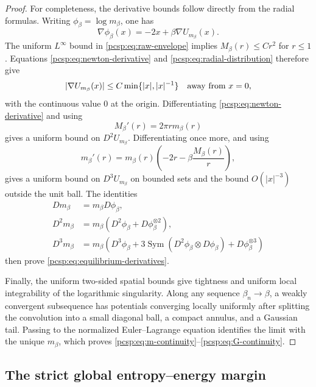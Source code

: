 \documentclass[11pt,reqno]{amsart}
\numberwithin{equation}{section}
\theoremstyle{plain}
\theoremstyle{definition}
\DeclarePairedDelimiter{\abs}{\lvert}{\rvert}
\newcommand{\be}{\beta}
\begin{document}
\begin{proof}
For completeness, the derivative bounds follow directly from the radial formulas.  Writing $\phi_\be=\log m_\be$, one has
\begin{equation}\label{pcsp:eq:score}
 \nabla\phi_\be(x)=-2x+\be\nabla U_{m_\be}(x).
\end{equation}
The uniform $L^\infty$ bound in \eqref{pcsp:eq:raw-envelope} implies $M_\be(r)\leq Cr^2$ for $r\leq1$.  Equations \eqref{pcsp:eq:newton-derivative} and \eqref{pcsp:eq:radial-distribution} therefore give
\begin{equation}\label{pcsp:eq:potential-first-derivative}
 \abs{\nabla U_{m_\be}(x)}\leq C\min\{|x|,|x|^{-1}\}
 \quad\text{away from }x=0,
\end{equation}
with the continuous value $0$ at the origin.  Differentiating \eqref{pcsp:eq:newton-derivative} and using
\begin{equation}\label{pcsp:eq:M-prime}
 M_\be'(r)=2\pi r m_\be(r)
\end{equation}
gives a uniform bound on $D^2U_{m_\be}$.  Differentiating once more, and using
\begin{equation}\label{pcsp:eq:m-radial-derivative}
 m_\be'(r)=m_\be(r)\left(-2r-\be\frac{M_\be(r)}r\right),
\end{equation}
gives a uniform bound on $D^3U_{m_\be}$ on bounded sets and the bound $O(|x|^{-3})$ outside the unit ball.  The identities
\begin{align}
 Dm_\be&=m_\be D\phi_\be,\label{pcsp:eq:derivative-one}\\
 D^2m_\be&=m_\be\left(D^2\phi_\be+D\phi_\be^{\otimes2}\right),\label{pcsp:eq:derivative-two}\\
 D^3m_\be&=m_\be\left(D^3\phi_\be
 +3\operatorname{Sym}(D^2\phi_\be\otimes D\phi_\be)
 +D\phi_\be^{\otimes3}\right)
 \label{pcsp:eq:derivative-three}
\end{align}
then prove \eqref{pcsp:eq:equilibrium-derivatives}.

Finally, the uniform two-sided spatial bounds give tightness and uniform local integrability of the logarithmic singularity.  Along any sequence $\be_n\to\be$, a weakly convergent subsequence has potentials converging locally uniformly after splitting the convolution into a small diagonal ball, a compact annulus, and a Gaussian tail.  Passing to the normalized Euler--Lagrange equation identifies the limit with the unique $m_\be$, which proves \eqref{pcsp:eq:m-continuity}--\eqref{pcsp:eq:G-continuity}.
\end{proof}

\subsection{The strict global entropy--energy margin}
\end{document}
